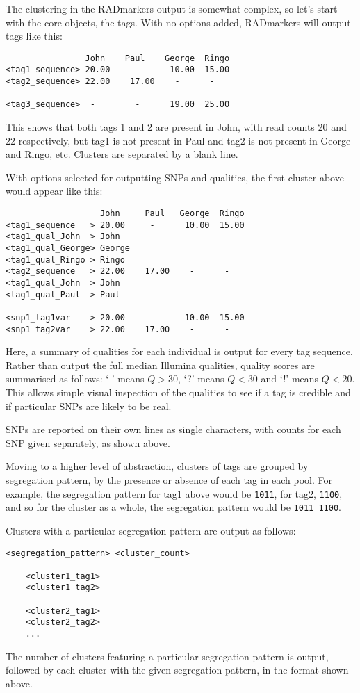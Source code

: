 \documentclass[a4paper]{article}
\begin{document}
The clustering in the RADmarkers output is somewhat complex, so let's start with the core objects, the tags. With no options added, RADmarkers will output tags like this:

\begin{verbatim}
                John    Paul    George  Ringo
<tag1_sequence> 20.00     -      10.00  15.00
<tag2_sequence> 22.00    17.00    -      -

<tag3_sequence>  -        -      19.00  25.00
\end{verbatim}

This shows that both tags 1 and 2 are present in John, with read counts 20 and 22 respectively, but tag1 is not present in Paul and tag2 is not present in George and Ringo, etc. Clusters are separated by a blank line.

With options selected for outputting SNPs and qualities, the first cluster above would appear like this:

\begin{verbatim}
                   John     Paul   George  Ringo
<tag1_sequence   > 20.00     -      10.00  15.00
<tag1_qual_John  > John
<tag1_qual_George> George
<tag1_qual_Ringo > Ringo
<tag2_sequence   > 22.00    17.00    -      -
<tag1_qual_John  > John
<tag1_qual_Paul  > Paul

<snp1_tag1var    > 20.00     -      10.00  15.00
<snp1_tag2var    > 22.00    17.00    -      -
\end{verbatim}

Here, a summary of qualities for each individual is output for every tag sequence. Rather than output the full median Illumina qualities, quality scores are summarised as follows: ` ' means $Q>30$, `?' means $Q<30$ and `!' means $Q<20$. This allows simple visual inspection of the qualities to see if a tag is credible and if particular SNPs are likely to be real.

SNPs are reported on their own lines as single characters, with counts for each SNP given separately, as shown above.

Moving to a higher level of abstraction, clusters of tags are grouped by segregation pattern, by the presence or absence of each tag in each pool. For example, the segregation pattern for tag1 above would be \verb|1011|, for tag2, \verb|1100|, and so for the cluster as a whole, the segregation pattern would be \verb|1011 1100|.

Clusters with a particular segregation pattern are output as follows:

\begin{verbatim}
<segregation_pattern> <cluster_count>
    
    <cluster1_tag1>
    <cluster1_tag2>
    
    <cluster2_tag1>
    <cluster2_tag2>
    ...
\end{verbatim}
The number of clusters featuring a particular segregation pattern is output, followed by each cluster with the given segregation pattern, in the format shown above.
\end{document}
